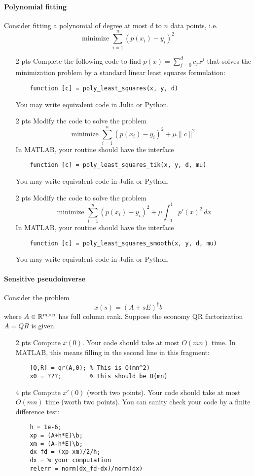 \documentclass[12pt, leqno]{article} %
\begin{document}
\paragraph*{Polynomial fitting}
Consider fitting a polynomial of degree at most $d$
to $n$ data points, i.e.
\[
  \mbox{minimize } \sum_{i=1}^n (p(x_i)-y_i)^2
\]
\begin{itemize}
\item[2 pts]
  Complete the following code to find $p(x) = \sum_{j=0}^d c_j x^j$
  that solves the minimization problem by a standard
  linear least squares formulation:
  \begin{lstlisting}
    function [c] = poly_least_squares(x, y, d)
  \end{lstlisting}
  You may write equivalent code in Julia or Python.
\item[2 pts]
  Modify the code to solve the problem
  \[
    \mbox{minimize } \sum_{i=1}^n (p(x_i)-y_i)^2 +
    \mu \|c\|^2
  \]
  In MATLAB, your routine should have the interface
  \begin{lstlisting}
    function [c] = poly_least_squares_tik(x, y, d, mu)
  \end{lstlisting}
  You may write equivalent code in Julia or Python.
\item[2 pts]
  Modify the code to solve the problem
  \[
    \mbox{minimize } \sum_{i=1}^n (p(x_i)-y_i)^2 +
    \mu \int_{-1}^1 p'(x)^2 \, dx
    \]
  In MATLAB, your routine should have the interface
  \begin{lstlisting}
    function [c] = poly_least_squares_smooth(x, y, d, mu)
  \end{lstlisting}
  You may write equivalent code in Julia or Python.
\end{itemize}


\paragraph*{Sensitive pseudoinverse}
Consider the problem
\[
  x(s) = (A+sE)^\dagger b
\]
where $A \in \mathbb{R}^{m \times n}$ has full column rank.  Suppose
the economy QR factorization $A = QR$ is given.
\begin{itemize}
\item[2 pts]
  Compute $x(0)$.  Your code should take at most $O(mn)$ time.  In MATLAB,
  this means filling in the second line in this fragment:
  \begin{lstlisting}
    [Q,R] = qr(A,0); % This is O(mn^2)
    x0 = ???;        % This should be O(mn)
  \end{lstlisting}
\item[4 pts]
  Compute $x'(0)$ (worth two points).
  Your code should take at most $O(mn)$ time (worth two points).
  You can sanity check your code by a finite difference test:
  \begin{lstlisting}
    h = 1e-6;
    xp = (A+h*E)\b;
    xm = (A-h*E)\b;
    dx_fd = (xp-xm)/2/h;
    dx = % your computation
    relerr = norm(dx_fd-dx)/norm(dx)
  \end{lstlisting}
\end{itemize}
\end{document}
